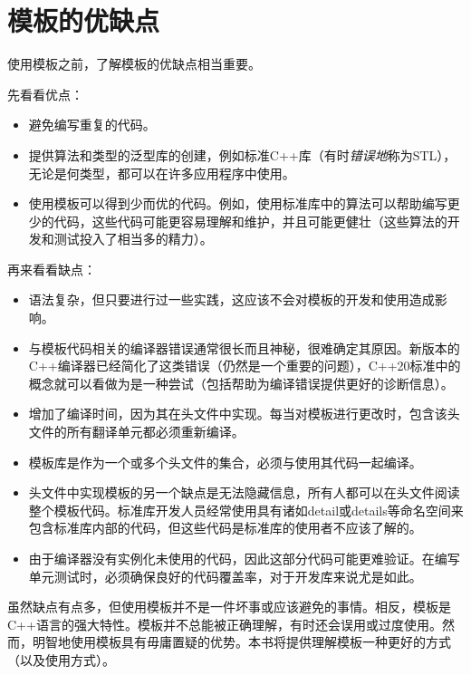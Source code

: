 \section{模板的优缺点}

使用模板之前，了解模板的优缺点相当重要。

先看看优点：

\begin{itemize}
  \item 避免编写重复的代码。
  \item 提供算法和类型的泛型库的创建，例如标准C++库（有时\textit{错误地}称为STL），无论是何类型，都可以在许多应用程序中使用。
  \item 使用模板可以得到少而优的代码。例如，使用标准库中的算法可以帮助编写更少的代码，这些代码可能更容易理解和维护，并且可能更健壮（这些算法的开发和测试投入了相当多的精力）。
\end{itemize}

再来看看缺点：

\begin{itemize}
  \item 语法复杂，但只要进行过一些实践，这应该不会对模板的开发和使用造成影响。
  \item 与模板代码相关的编译器错误通常很长而且神秘，很难确定其原因。新版本的C++编译器已经简化了这类错误（仍然是一个重要的问题），C++20标准中的概念就可以看做为是一种尝试（包括帮助为编译错误提供更好的诊断信息）。
  \item 增加了编译时间，因为其在头文件中实现。每当对模板进行更改时，包含该头文件的所有翻译单元都必须重新编译。
  \item 模板库是作为一个或多个头文件的集合，必须与使用其代码一起编译。
  \item 头文件中实现模板的另一个缺点是无法隐藏信息，所有人都可以在头文件阅读整个模板代码。标准库开发人员经常使用具有诸如detail或details等命名空间来包含标准库内部的代码，但这些代码是标准库的使用者不应该了解的。
  \item 由于编译器没有实例化未使用的代码，因此这部分代码可能更难验证。在编写单元测试时，必须确保良好的代码覆盖率，对于开发库来说尤是如此。
\end{itemize}

虽然缺点有点多，但使用模板并不是一件坏事或应该避免的事情。相反，模板是C++语言的强大特性。模板并不总能被正确理解，有时还会误用或过度使用。然而，明智地使用模板具有毋庸置疑的优势。本书将提供理解模板一种更好的方式（以及使用方式）。







